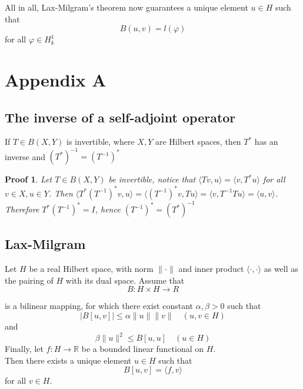 \documentclass[14pt,a4paper]{scrartcl}
\newtheorem*{proof*}{Proof}
\numberwithin{equation}{section}
\newcommand{\R}{\mathbb{R}}
\begin{document}
All in all, Lax-Milgram's theorem now guarantees a unique element $u \in H$ such that
	\[ B(u, v) = l(\varphi) \]
for all $\varphi \in H^{1}_{k}$

\newpage


\newpage

\section{Appendix A}


\subsection{The inverse of a self-adjoint operator} %
If $T \in B(X, Y)$ is invertible, where $X, Y$ are Hilbert spaces, then $T^{*}$ has an inverse and $(T^{*})^{-1} = (T^{-1})^{*}$

\begin{proof*}
	Let $T \in B(X, Y)$ be invertible, notice that $\langle Tv , u \rangle = \langle v , T^{*} u \rangle$ for all $v \in X, u \in Y$. Then $\langle T^{*} (T^{-1})^{*}v, u \rangle = \langle (T^{-1})^{*} v, T u \rangle = \langle v , T^{-1} T u \rangle = \langle u, v \rangle$. \\
	Therefore $T^{*} (T^{-1})^{*} = I$, hence $(T^{-1})^{*} = (T^{*})^{-1}$
\end{proof*}

\subsection{Lax-Milgram}
Let $H$ be a real Hilbert space, with norm $\| \cdot \|$ and inner product $\langle \cdot, \cdot \rangle$ as well as the pairing of $H$ with its dual space. Assume that
	\[ B \colon H \times H \rightarrow R  \]

is a bilinear mapping, for which there exist constant $\alpha, \beta > 0$ such that
	\[ |B[u, v]| \leq \alpha \| u \| \| v \| \quad (u, v \in H) \]
and
	\[ \beta \| u \|^{2} \leq B[u, u] \quad ( u \in H) \]
Finally, let $f \colon H \rightarrow \R$ be a bounded linear functional on $H$. \\

Then there exists a unique element $u \in H$ such that
	\[ B[u, v] = \langle f, v \rangle \]
for all $v \in H$.
\end{document}
